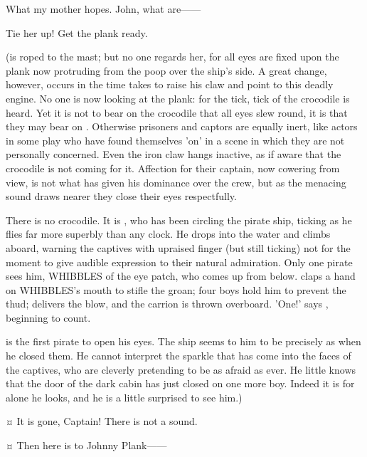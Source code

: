 \begin{drama}
\firsttwinspeaks
What my mother hopes.
John, what are——

\hookspeaks
Tie her up!
Get the plank ready.

\begin{stagedir}
(\wendy is roped to the mast;
but no one regards her, for all eyes are fixed upon the plank now protruding from the poop over the ship's side.
A great change, however, occurs in the time \hook takes to raise his claw and point to this deadly engine.
No one is now looking at the plank: for the tick, tick of the crocodile is heard.
Yet it is not to bear on the crocodile that all eyes slew round, it is that they may bear on \hook.
Otherwise prisoners and captors are equally inert,
like actors in some play who have found themselves 'on' in a scene in which they are not personally concerned.
Even the iron claw hangs inactive, as if aware that the crocodile is not coming for it.
Affection for their captain, now cowering from view, is not what has given \hook his dominance over the crew,
but as the menacing sound draws nearer they close their eyes respectfully.

There is no crocodile.
It is \peter, who has been circling the pirate ship, ticking as he flies far more superbly than any clock.
He drops into the water and climbs aboard, warning the captives with upraised finger (but still ticking)
not for the moment to give audible expression to their natural admiration.
Only one pirate sees him, {\namefont WHIBBLES} of the eye patch, who comes up from below.
\john claps a hand on {\namefont WHIBBLES}'s mouth to stifle the groan;
four boys hold him to prevent the thud;
\peter delivers the blow, and the carrion is thrown overboard.
'One!\@' says \slightly, beginning to count.

\starkey is the first pirate to open his eyes.
The ship seems to him to be precisely as when he closed them.
He cannot interpret the sparkle that has come into the faces of the captives,
who are cleverly pretending to be as afraid as ever.
He little knows that the door of the dark cabin has just closed on one more boy.
Indeed it is for \hook alone he looks, and he is a little surprised to see him.)
\end{stagedir}

\starkeyspeaks {}¤
It is gone, Captain!
There is not a sound.


\hookspeaks {}¤
Then here is to Johnny Plank——


\end{drama}

